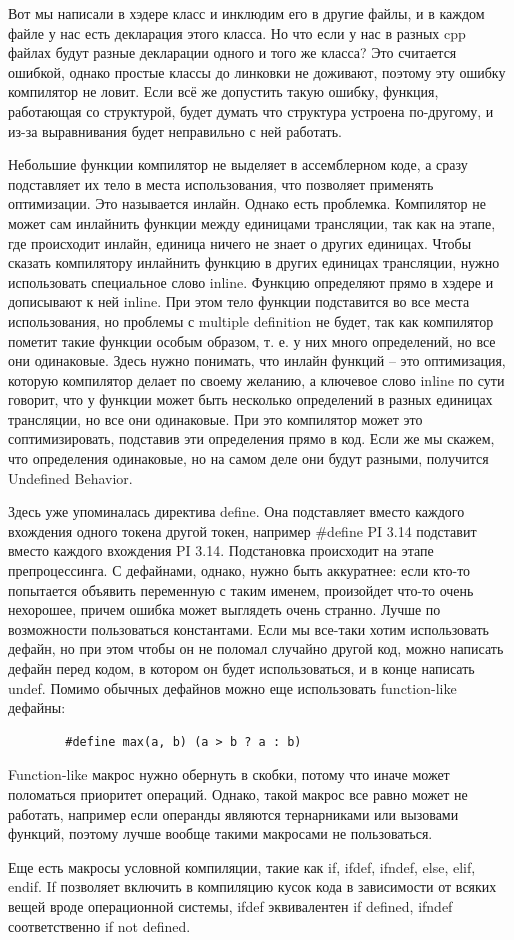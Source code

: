 \documentclass[12pt, a4paper]{article}
\begin{document}
	\par Вот мы написали в хэдере класс и инклюдим его в другие файлы, и в каждом файле у нас есть декларация этого класса. Но что если у нас в разных cpp файлах будут разные декларации одного и того же класса? Это считается ошибкой, однако простые классы до линковки не доживают, поэтому эту ошибку компилятор не ловит. Если всё же допустить такую ошибку, функция, работающая со структурой, будет думать что структура устроена по-другому, и из-за выравнивания будет неправильно с ней работать. 
	\\\par Небольшие функции компилятор не выделяет в ассемблерном коде, а сразу подставляет их тело в места использования, что позволяет применять оптимизации. Это называется инлайн. Однако есть проблемка. Компилятор не может сам инлайнить функции между единицами трансляции, так как на этапе, где происходит инлайн, единица ничего не знает о других единицах. Чтобы сказать компилятору инлайнить функцию в других единицах трансляции, нужно использовать специальное слово inline. Функцию определяют прямо в хэдере и дописывают к ней inline. При этом тело функции подставится во все места использования, но проблемы с multiple definition не будет, так как компилятор пометит такие функции особым образом, т. е. у них много определений, но все они одинаковые. Здесь нужно понимать, что инлайн функций -- это оптимизация, которую компилятор делает по своему желанию, а ключевое слово inline по сути говорит, что у функции может быть несколько определений в разных единицах трансляции, но все они одинаковые. При это компилятор может это соптимизировать, подставив эти определения прямо в код. Если же мы скажем, что определения одинаковые, но на самом деле они будут разными, получится Undefined Behavior.
	\\\par Здесь уже упоминалась директива define. Она подставляет вместо каждого вхождения одного токена другой токен, например \#define PI 3.14 подставит вместо каждого вхождения PI 3.14. Подстановка происходит на этапе препроцессинга. С дефайнами, однако, нужно быть аккуратнее: если кто-то попытается объявить переменную с таким именем, произойдет что-то очень нехорошее, причем ошибка может выглядеть очень странно. Лучше по возможности пользоваться константами. Если мы все-таки хотим использовать дефайн, но при этом чтобы он не поломал случайно другой код, можно написать дефайн перед кодом, в котором он будет использоваться, и в конце написать undef. Помимо обычных дефайнов можно еще использовать function-like дефайны:
	\begin{verbatim}
		#define max(a, b) (a > b ? a : b)
	\end{verbatim}
	Function-like макрос нужно обернуть в скобки, потому что иначе может поломаться приоритет операций. Однако, такой макрос все равно может не работать, например если операнды являются тернарниками или вызовами функций, поэтому лучше вообще такими макросами не пользоваться.
	\par Еще есть макросы условной компиляции, такие как if, ifdef, ifndef, else, elif, endif. If позволяет включить в компиляцию кусок кода в зависимости от всяких вещей вроде операционной системы, ifdef эквивалентен if defined, ifndef соответственно if not defined.
\end{document}
